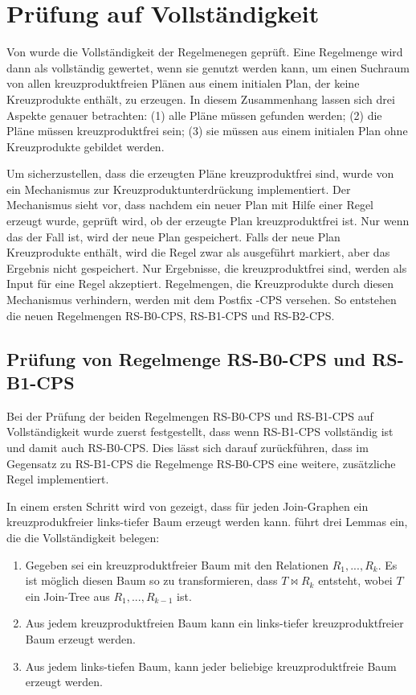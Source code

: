 \section{Prüfung auf Vollständigkeit}

Von \cite{shanbhag2014optimizing} wurde die Vollständigkeit der Regelmenegen geprüft. Eine Regelmenge wird dann als vollständig gewertet, wenn sie genutzt werden kann, um einen Suchraum von allen kreuzproduktfreien Plänen aus einem initialen Plan, der keine Kreuzprodukte enthält, zu erzeugen. In diesem Zusammenhang lassen sich drei Aspekte genauer betrachten: (1) alle Pläne müssen gefunden werden; (2) die Pläne müssen kreuzproduktfrei sein; (3) sie müssen aus einem initialen Plan ohne Kreuzprodukte gebildet werden.

Um sicherzustellen, dass die erzeugten Pläne kreuzproduktfrei sind, wurde von \cite{shanbhag2014optimizing} ein Mechanismus zur Kreuzproduktunterdrückung implementiert. Der Mechanismus sieht vor, dass nachdem ein neuer Plan mit Hilfe einer Regel erzeugt wurde, geprüft wird, ob der erzeugte Plan kreuzproduktfrei ist. Nur wenn das der Fall ist, wird der neue Plan gespeichert. Falls der neue Plan Kreuzprodukte enthält, wird die Regel zwar als ausgeführt markiert, aber das Ergebnis nicht gespeichert. Nur Ergebnisse, die kreuzproduktfrei sind, werden als Input für eine Regel akzeptiert. Regelmengen, die Kreuzprodukte durch diesen Mechanismus verhindern,  werden mit dem Postfix -CPS versehen. So entstehen die neuen Regelmengen RS-B0-CPS, RS-B1-CPS und RS-B2-CPS.





\subsection{Prüfung von Regelmenge RS-B0-CPS und RS-B1-CPS}

Bei der Prüfung der beiden Regelmengen RS-B0-CPS und RS-B1-CPS auf Voll\-ständigkeit wurde zuerst festgestellt, dass wenn RS-B1-CPS vollständig ist und damit auch RS-B0-CPS. Dies lässt sich darauf zurückführen, dass im Gegensatz zu RS-B1-CPS die Regelmenge RS-B0-CPS eine weitere, zusätzliche Regel implementiert.

In einem ersten Schritt wird von \cite{shanbhag2014optimizing} gezeigt, dass für jeden Join-Graphen ein kreuzprodukfreier links-tiefer Baum erzeugt werden kann.  \cite{shanbhag2014optimizing} führt drei Lemmas ein, die die Vollständigkeit belegen:

\begin{enumerate}
\item Gegeben sei ein kreuzproduktfreier Baum mit den Relationen $R_1, ..., R_k$. Es ist möglich diesen Baum so zu transformieren, dass $T \Join R_k$ entsteht, wobei $T$ ein Join-Tree aus $R_1, ..., R_{k-1}$ ist.
\item Aus jedem kreuzproduktfreien Baum kann ein links-tiefer kreuzproduktfreier Baum erzeugt werden.
\item Aus jedem links-tiefen Baum, kann jeder beliebige kreuzproduktfreie Baum erzeugt werden.
\end{enumerate}

